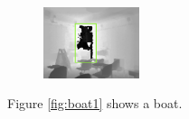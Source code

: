 \documentclass{article}
\begin{document}
\begin{figure}
    \centering
    \includegraphics[width=0.25\textwidth]{images/depth_with_invalid.png}
\end{figure}

Figure \ref{fig:boat1} shows a boat.
\end{document}
